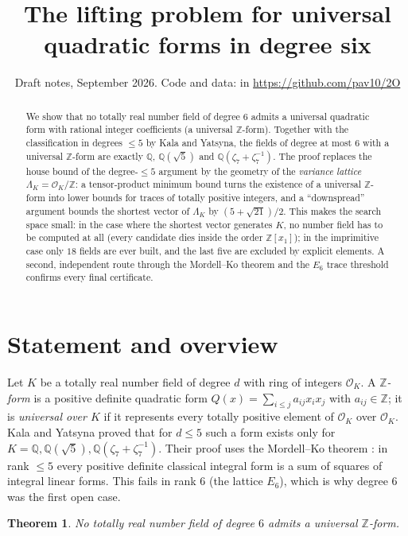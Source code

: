\documentclass[11pt]{amsart}
\title{The lifting problem for universal quadratic forms in degree six}
\date{Draft notes, September 2026. Code and data: \file{higher-degree/} in \url{https://github.com/pav10/2O}}
\newtheorem{theorem}{Theorem}[section]
\theoremstyle{definition}
\newcommand{\OK}{\mathcal{O}_K}
\newcommand{\Q}{\mathbb{Q}}
\newcommand{\Z}{\mathbb{Z}}
\newcommand{\LamK}{\Lambda_K}
\begin{document}
\begin{abstract}
We show that no totally real number field of degree $6$ admits a universal quadratic form
with rational integer coefficients (a universal $\Z$-form).  Together with the classification
in degrees $\le 5$ by Kala and Yatsyna, the fields of degree at most $6$ with a universal
$\Z$-form are exactly $\Q$, $\Q(\sqrt5)$ and $\Q(\zeta_7+\zeta_7^{-1})$.
The proof replaces the house bound of the degree-$\le 5$ argument by the geometry of the
\emph{variance lattice} $\LamK=\OK/\Z$: a tensor-product minimum bound turns the existence of a
universal $\Z$-form into lower bounds for traces of totally positive integers, and a
``downspread'' argument bounds the shortest vector of $\LamK$ by $(5+\sqrt{21})/2$.
This makes the search space small: in the case where the shortest vector generates $K$,
no number field has to be computed at all (every candidate dies inside the order $\Z[x_1]$);
in the imprimitive case only $18$ fields are ever built, and the last five are excluded by
explicit elements.  A second, independent route through the Mordell--Ko theorem and the
$E_6$ trace threshold confirms every final certificate.
\end{abstract}

\maketitle

\section{Statement and overview}\label{sec:intro}

Let $K$ be a totally real number field of degree $d$ with ring of integers $\OK$.  A
\emph{$\Z$-form} is a positive definite quadratic form $Q(x)=\sum_{i\le j}a_{ij}x_ix_j$ with
$a_{ij}\in\Z$; it is \emph{universal over $K$} if it represents every totally positive element
of $\OK$ over $\OK$.  Kala and Yatsyna \cite{KY-EB} proved that for $d\le5$ such a form exists
only for $K=\Q,\Q(\sqrt5),\Q(\zeta_7+\zeta_7^{-1})$.  Their proof uses the Mordell--Ko
theorem \cite{Ko}: in rank $\le5$ every positive definite classical integral form is a sum of
squares of integral linear forms.  This fails in rank $6$ (the lattice $E_6$), which is why
degree $6$ was the first open case.

\begin{theorem}\label{thm:main}
No totally real number field of degree $6$ admits a universal $\Z$-form.
\end{theorem}
\end{document}
